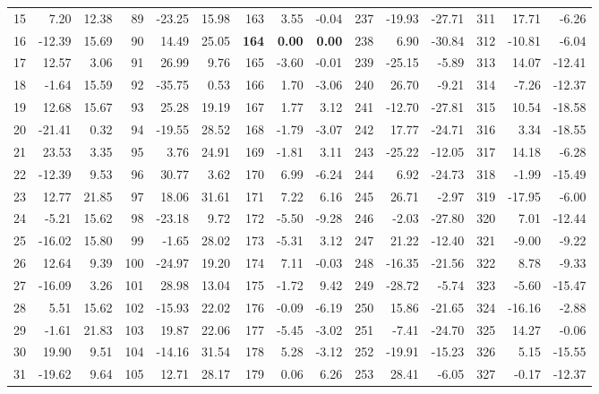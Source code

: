 \begin{table}[!h]
{\begin{tabular}{|r r r||r r r||r r r||r r r||r r r|}
15 &   7.20 & 12.38 &  89 & -23.25 & 15.98 & 163 &   3.55 &  -0.04 & 237 & -19.93 & -27.71 & 311 &  17.71 &  -6.26 \\
16 & -12.39 & 15.69 &  90 &  14.49 & 25.05 & {\bf164} &   {\bf0.00} &   {\bf0.00} & 238 &   6.90 & -30.84 & 312 & -10.81 &  -6.04 \\
17 &  12.57 &  3.06 &  91 &  26.99 &  9.76 & 165 &  -3.60 &  -0.01 & 239 & -25.15 &  -5.89 & 313 &  14.07 & -12.41 \\
18 &  -1.64 & 15.59 &  92 & -35.75 &  0.53 & 166 &   1.70 &  -3.06 & 240 &  26.70 &  -9.21 & 314 &  -7.26 & -12.37 \\
19 &  12.68 & 15.67 &  93 &  25.28 & 19.19 & 167 &   1.77 &   3.12 & 241 & -12.70 & -27.81 & 315 &  10.54 & -18.58 \\
20 & -21.41 &  0.32 &  94 & -19.55 & 28.52 & 168 &  -1.79 &  -3.07 & 242 &  17.77 & -24.71 & 316 &   3.34 & -18.55 \\
21 &  23.53 &  3.35 &  95 &   3.76 & 24.91 & 169 &  -1.81 &   3.11 & 243 & -25.22 & -12.05 & 317 &  14.18 &  -6.28 \\
22 & -12.39 &  9.53 &  96 &  30.77 &  3.62 & 170 &   6.99 &  -6.24 & 244 &   6.92 & -24.73 & 318 &  -1.99 & -15.49 \\
23 &  12.77 & 21.85 &  97 &  18.06 & 31.61 & 171 &   7.22 &   6.16 & 245 &  26.71 &  -2.97 & 319 & -17.95 &  -6.00 \\ 
24 &  -5.21 & 15.62 &  98 & -23.18 &  9.72 & 172 &  -5.50 &  -9.28 & 246 &  -2.03 & -27.80 & 320 &   7.01 & -12.44 \\
25 & -16.02 & 15.80 &  99 &  -1.65 & 28.02 & 173 &  -5.31 &   3.12 & 247 &  21.22 & -12.40 & 321 &  -9.00 &  -9.22 \\
26 &  12.64 &  9.39 & 100 & -24.97 & 19.20 & 174 &   7.11 &  -0.03 & 248 & -16.35 & -21.56 & 322 &   8.78 &  -9.33 \\
27 & -16.09 &  3.26 & 101 &  28.98 & 13.04 & 175 &  -1.72 &   9.42 & 249 & -28.72 &  -5.74 & 323 &  -5.60 & -15.47 \\
28 &   5.51 & 15.62 & 102 & -15.93 & 22.02 & 176 &  -0.09 &  -6.19 & 250 &  15.86 & -21.65 & 324 & -16.16 &  -2.88 \\
29 &  -1.61 & 21.83 & 103 &  19.87 & 22.06 & 177 &  -5.45 &  -3.02 & 251 &  -7.41 & -24.70 & 325 &  14.27 &  -0.06 \\
30 &  19.90 &  9.51 & 104 & -14.16 & 31.54 & 178 &   5.28 &  -3.12 & 252 & -19.91 & -15.23 & 326 &   5.15 & -15.55 \\
31 & -19.62 &  9.64 & 105 &  12.71 & 28.17 & 179 &   0.06 &   6.26 & 253 &  28.41 &  -6.05 & 327 &  -0.17 & -12.37 \\

\end{tabular}}
\end{table}
